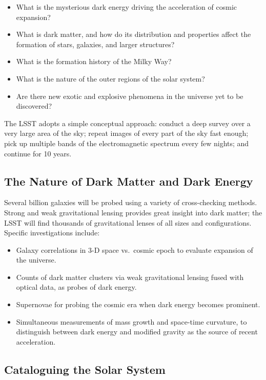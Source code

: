 \documentclass[12pt,a4paper]{article}
\begin{document}
\begin{itemize}[leftmargin=*]
  \item What is the mysterious dark energy driving the acceleration of cosmic
        expansion?
  \item What is dark matter, and how do its distribution and properties affect
        the formation of stars, galaxies, and larger structures?
  \item What is the formation history of the Milky Way?
  \item What is the nature of the outer regions of the solar system?
  \item Are there new exotic and explosive phenomena in the universe yet to be
        discovered?
\end{itemize}

The LSST adopts a simple conceptual approach: conduct a deep survey over a
very large area of the sky; repeat images of every part of the sky fast enough;
pick up multiple bands of the electromagnetic spectrum every few nights; and
continue for 10 years.

\subsection{The Nature of Dark Matter and Dark Energy}

Several billion galaxies will be probed using a variety of cross-checking
methods. Strong and weak gravitational lensing provides great insight into
dark matter; the LSST will find thousands of gravitational lenses of all sizes
and configurations. Specific investigations include:

\begin{itemize}[leftmargin=*]
  \item Galaxy correlations in 3-D space vs.\ cosmic epoch to evaluate
        expansion of the universe.
  \item Counts of dark matter clusters via weak gravitational lensing fused
        with optical data, as probes of dark energy.
  \item Supernovae for probing the cosmic era when dark energy becomes
        prominent.
  \item Simultaneous measurements of mass growth and space-time curvature, to
        distinguish between dark energy and modified gravity as the source of
        recent acceleration.
\end{itemize}

\subsection{Cataloguing the Solar System}
\end{document}
